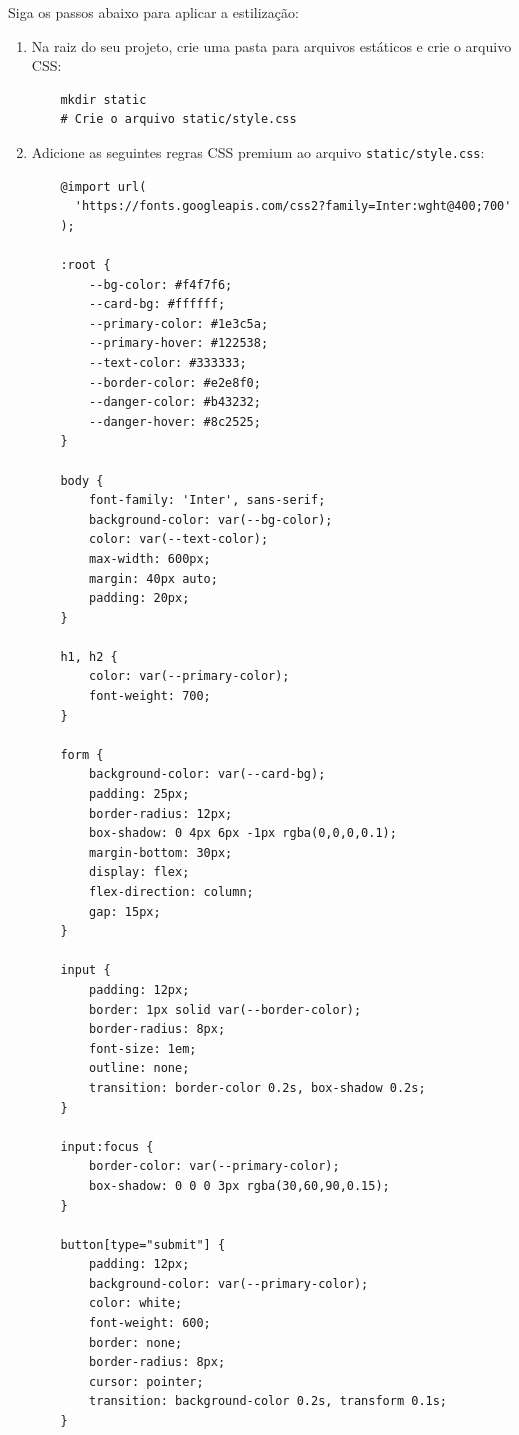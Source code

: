 \documentclass[12pt,a4paper]{article}
\begin{document}
Siga os passos abaixo para aplicar a estilização:
\begin{enumerate}
    \item Na raiz do seu projeto, crie uma pasta para arquivos estáticos e crie o arquivo CSS:
    \begin{boxCodigo}
    \begin{verbatim}
    mkdir static
    # Crie o arquivo static/style.css
    \end{verbatim}
    \end{boxCodigo}
    \item Adicione as seguintes regras CSS premium ao arquivo \texttt{static/style.css}:
    \begin{boxCodigo}
    \begin{verbatim}
    @import url(
      'https://fonts.googleapis.com/css2?family=Inter:wght@400;700'
    );

    :root {
        --bg-color: #f4f7f6;
        --card-bg: #ffffff;
        --primary-color: #1e3c5a;
        --primary-hover: #122538;
        --text-color: #333333;
        --border-color: #e2e8f0;
        --danger-color: #b43232;
        --danger-hover: #8c2525;
    }

    body {
        font-family: 'Inter', sans-serif;
        background-color: var(--bg-color);
        color: var(--text-color);
        max-width: 600px;
        margin: 40px auto;
        padding: 20px;
    }

    h1, h2 {
        color: var(--primary-color);
        font-weight: 700;
    }

    form {
        background-color: var(--card-bg);
        padding: 25px;
        border-radius: 12px;
        box-shadow: 0 4px 6px -1px rgba(0,0,0,0.1);
        margin-bottom: 30px;
        display: flex;
        flex-direction: column;
        gap: 15px;
    }

    input {
        padding: 12px;
        border: 1px solid var(--border-color);
        border-radius: 8px;
        font-size: 1em;
        outline: none;
        transition: border-color 0.2s, box-shadow 0.2s;
    }

    input:focus {
        border-color: var(--primary-color);
        box-shadow: 0 0 0 3px rgba(30,60,90,0.15);
    }

    button[type="submit"] {
        padding: 12px;
        background-color: var(--primary-color);
        color: white;
        font-weight: 600;
        border: none;
        border-radius: 8px;
        cursor: pointer;
        transition: background-color 0.2s, transform 0.1s;
    }


\end{verbatim}
\end{boxCodigo}
\end{enumerate}
\end{document}
